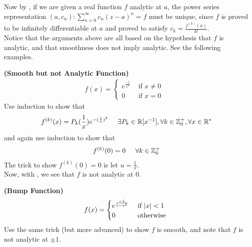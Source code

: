 \documentclass{report}
\begin{document}
\begin{mdframed}



Now by , if we are given a real function $f$ analytic at $a$, the power series representation $(a,c_n):\sum_{n=0}^\infty c_n(z-a)^n=f$ must be unique, since $f$ is proved to be infinitely differentiable at $a$ and proved to satisfy $c_k=\frac{f^{(k)}(a)}{k!}$.\\

Notice that the arguments above are all based on the hypothesis that $f$ is analytic, and that smoothness does not imply analytic. See the following examples.
\end{mdframed}
\begin{Example}{\textbf{(Smooth but not Analytic Function)}}{}
\begin{align*}
f(x)=\begin{cases}
  e^{\frac{-1}{x^2}}& \text{ if $x\neq 0$ }\\
  0& \text{ if $x=0$ }
\end{cases}
\end{align*}
Use induction to show that 
\begin{align*}
f^{(k)}(x)=P_k(\frac{1}{x})e^{-(\frac{1}{x})^2}\hspace{0.5cm}\exists P_k\in\mathbb{R}[x^{-1}],\forall k\in\mathbb{Z}^+_0,\forall x\in\mathbb{R}^*
\end{align*}
and again use induction to show that  
\begin{align*}
f^{(k)}(0)=0\hspace{0.5cm}\forall k\in\mathbb{Z}_0^+
\end{align*}
The trick to show $f^{(k)}(0)=0$ is let $u=\frac{1}{x}$.\\

Now, with , we see that $f$ is not analytic at $0$. 
\end{Example}
\begin{Example}{\textbf{(Bump Function)}}{}
\begin{align*}
f(x)=\begin{cases}
  e^{\frac{-1}{1-x^2}}& \text{ if $\left|x\right|<1$ }\\
  0& \text{ otherwise }
\end{cases}
\end{align*}
Use the same trick (but more advanced) to show $f$ is smooth, and note that $f$ is not analytic at $\pm 1$. 
\end{Example}
\begin{mdframed}
\end{mdframed}
\end{document}
